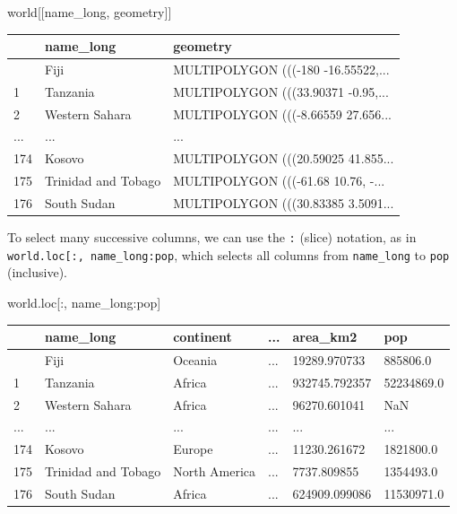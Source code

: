 \documentclass[
  letterpaper,
]{krantz}
\newenvironment{Shaded}{\begin{snugshade}}{\end{snugshade}}
\newcommand{\NormalTok}[1]{\textcolor[rgb]{0.00,0.23,0.31}{#1}}
\newcommand{\StringTok}[1]{\textcolor[rgb]{0.13,0.47,0.30}{#1}}
\begin{document}
\begin{Shaded}
\begin{Highlighting}[]
\NormalTok{world[[}\StringTok{\textquotesingle{}name\_long\textquotesingle{}}\NormalTok{, }\StringTok{\textquotesingle{}geometry\textquotesingle{}}\NormalTok{]]}
\end{Highlighting}
\end{Shaded}

\begin{longtable}[]{@{}lll@{}}
\toprule\noalign{}
& name\_long & geometry \\
\midrule\noalign{}
\endhead
\bottomrule\noalign{}
\endlastfoot
0 & Fiji & MULTIPOLYGON (((-180 -16.55522,... \\
1 & Tanzania & MULTIPOLYGON (((33.90371 -0.95,... \\
2 & Western Sahara & MULTIPOLYGON (((-8.66559 27.656... \\
... & ... & ... \\
174 & Kosovo & MULTIPOLYGON (((20.59025 41.855... \\
175 & Trinidad and Tobago & MULTIPOLYGON (((-61.68 10.76, -... \\
176 & South Sudan & MULTIPOLYGON (((30.83385 3.5091... \\
\end{longtable}

To select many successive columns, we can use the \texttt{:} (slice)
notation, as in
\texttt{world.loc{[}:,\ \textquotesingle{}name\_long\textquotesingle{}:\textquotesingle{}pop\textquotesingle{}{]}},
which selects all columns from \texttt{name\_long} to \texttt{pop}
(inclusive).

\begin{Shaded}
\begin{Highlighting}[]
\NormalTok{world.loc[:, }\StringTok{\textquotesingle{}name\_long\textquotesingle{}}\NormalTok{:}\StringTok{\textquotesingle{}pop\textquotesingle{}}\NormalTok{]}
\end{Highlighting}
\end{Shaded}

\begin{longtable}[]{@{}llllll@{}}
\toprule\noalign{}
& name\_long & continent & ... & area\_km2 & pop \\
\midrule\noalign{}
\endhead
\bottomrule\noalign{}
\endlastfoot
0 & Fiji & Oceania & ... & 19289.970733 & 885806.0 \\
1 & Tanzania & Africa & ... & 932745.792357 & 52234869.0 \\
2 & Western Sahara & Africa & ... & 96270.601041 & NaN \\
... & ... & ... & ... & ... & ... \\
174 & Kosovo & Europe & ... & 11230.261672 & 1821800.0 \\
175 & Trinidad and Tobago & North America & ... & 7737.809855 &
1354493.0 \\
176 & South Sudan & Africa & ... & 624909.099086 & 11530971.0 \\
\end{longtable}
\end{document}
